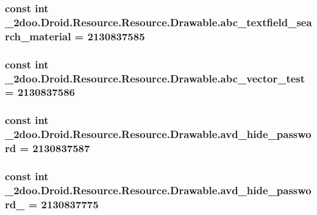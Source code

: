 \hypertarget{class__2doo_1_1_droid_1_1_resource_1_1_drawable_ebb86aea0f176242d9cd68f13e00af09}{
\subsubsection[{abc\_\-textfield\_\-search\_\-material}]{\setlength{\rightskip}{0pt plus 5cm}const int \_\-2doo.Droid.Resource.Resource.Drawable.abc\_\-textfield\_\-search\_\-material = 2130837585}}
\label{class__2doo_1_1_droid_1_1_resource_1_1_drawable_ebb86aea0f176242d9cd68f13e00af09}


\hypertarget{class__2doo_1_1_droid_1_1_resource_1_1_drawable_156d35e219dca7561ebce1e1ae7ad0d3}{
\subsubsection[{abc\_\-vector\_\-test}]{\setlength{\rightskip}{0pt plus 5cm}const int \_\-2doo.Droid.Resource.Resource.Drawable.abc\_\-vector\_\-test = 2130837586}}
\label{class__2doo_1_1_droid_1_1_resource_1_1_drawable_156d35e219dca7561ebce1e1ae7ad0d3}


\hypertarget{class__2doo_1_1_droid_1_1_resource_1_1_drawable_d0f035fb740990f376e12b9e49027484}{
\subsubsection[{avd\_\-hide\_\-password}]{\setlength{\rightskip}{0pt plus 5cm}const int \_\-2doo.Droid.Resource.Resource.Drawable.avd\_\-hide\_\-password = 2130837587}}
\label{class__2doo_1_1_droid_1_1_resource_1_1_drawable_d0f035fb740990f376e12b9e49027484}


\hypertarget{class__2doo_1_1_droid_1_1_resource_1_1_drawable_625b55db53a37ffc9c6cd281b742dbbd}{
\subsubsection[{avd\_\-hide\_\-password\_\-1}]{\setlength{\rightskip}{0pt plus 5cm}const int \_\-2doo.Droid.Resource.Resource.Drawable.avd\_\-hide\_\-password\_ = 2130837775}}
\label{class__2doo_1_1_droid_1_1_resource_1_1_drawable_625b55db53a37ffc9c6cd281b742dbbd}


